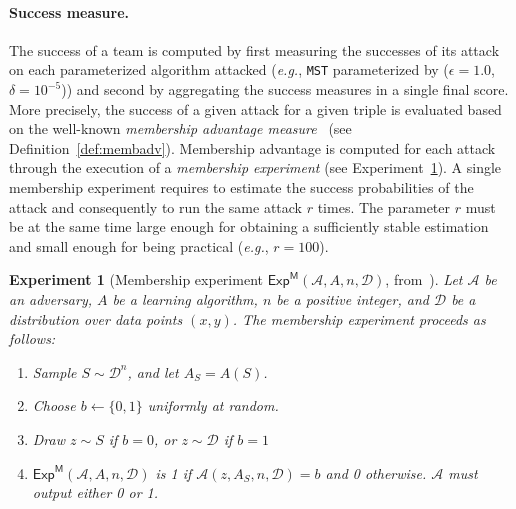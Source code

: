 \documentclass{article}
\newtheorem*{experiment}{Experiment}
\begin{document}
\paragraph{Success measure.}
The success of a team is computed by first measuring the successes of its attack on each parameterized algorithm attacked (\textit{e.g.}, \texttt{MST} parameterized by ($\epsilon=1.0$, $\delta=10^{-5}$)) and second by aggregating the success measures in a single final score.
More precisely, the success of a given attack for a given triple is evaluated based on the well-known \emph{membership advantage measure}~\cite{yeom2018} (see Definition~\ref{def:membadv}).
Membership advantage is computed for each attack through the execution of a \emph{membership experiment} (see Experiment~\ref{exp:membexp}).
A single membership experiment requires to estimate the success probabilities of the attack and consequently to run the same attack $r$ times.
The parameter $r$ must be at the same time large enough for obtaining a sufficiently stable estimation and small enough for being practical (\emph{e.g.},
$r=100$).
\begin{experiment}[Membership experiment $\textsf{Exp}^{\textsf{M}}(\mathcal{A}, A, n, \mathcal{D})$, from~\cite{yeom2018}]
  \label{exp:membexp}
  Let $\mathcal{A}$ be an adversary, $A$ be a learning algorithm, $n$ be a positive integer, and $\mathcal{D}$ be a distribution over data points $(x,y)$. The \textup{membership experiment}
  proceeds as follows:
  \begin{enumerate}
  \item Sample $S \sim \mathcal{D}^n$, and let $A_S = A(S)$.
  \item Choose $b \leftarrow \{0,1\}$ uniformly at random.
  \item Draw $z \sim S$ if $b=0$, or $z \sim \mathcal{D}$ if $b=1$
  \item
    \textup{$\textsf{Exp}^{\textsf{M}}(\mathcal{A}, A, n,
      \mathcal{D})$} is 1 if $\mathcal{A}(z, A_S, n, \mathcal{D})=b$
    and 0 otherwise. $\mathcal{A}$ must output either 0 or 1.
  \end{enumerate}
\end{experiment}
\end{document}
